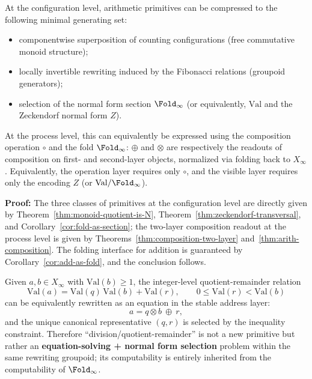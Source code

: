 \begin{corollary}\label{cor:primitive-free-arith}
At the configuration level, arithmetic primitives can be compressed to the following minimal generating set:
\begin{itemize}
  \item componentwise superposition of counting configurations (free commutative monoid structure);
  \item locally invertible rewriting induced by the Fibonacci relations (groupoid generators);
  \item selection of the normal form section $\Fold_\infty$ (or equivalently, $\mathrm{Val}$ and the Zeckendorf normal form $Z$).
\end{itemize}
At the process level, this can equivalently be expressed using the composition operation $\circ$ and the fold $\Fold_\infty$: $\oplus$ and $\otimes$ are respectively the readouts of composition on first- and second-layer objects, normalized via folding back to $X_\infty$.
Equivalently, the operation layer requires only $\circ$, and the visible layer requires only the encoding $Z$ (or $\mathrm{Val}/\Fold_\infty$).
\end{corollary}

\textbf{Proof:}
The three classes of primitives at the configuration level are directly given by Theorem~\ref{thm:monoid-quotient-is-N}, Theorem~\ref{thm:zeckendorf-transversal}, and Corollary~\ref{cor:fold-as-section}; the two-layer composition readout at the process level is given by Theorems~\ref{thm:composition-two-layer} and~\ref{thm:arith-composition}. The folding interface for addition is guaranteed by Corollary~\ref{cor:add-as-fold}, and the conclusion follows.

\begin{remark}\label{rem:division-as-selection}
Given $a,b\in X_\infty$ with $\mathrm{Val}(b)\ge 1$, the integer-level quotient-remainder relation
\[
\mathrm{Val}(a)=\mathrm{Val}(q)\,\mathrm{Val}(b)+\mathrm{Val}(r),\qquad 0\le \mathrm{Val}(r)<\mathrm{Val}(b)
\]
can be equivalently rewritten as an equation in the stable address layer:
\[
a=q\otimes b\ \oplus\ r,
\]
and the unique canonical representative $(q,r)$ is selected by the inequality constraint. Therefore ``division/quotient-remainder'' is not a new primitive but rather an \textbf{equation-solving + normal form selection} problem within the same rewriting groupoid; its computability is entirely inherited from the computability of $\Fold_\infty$.
\end{remark}


